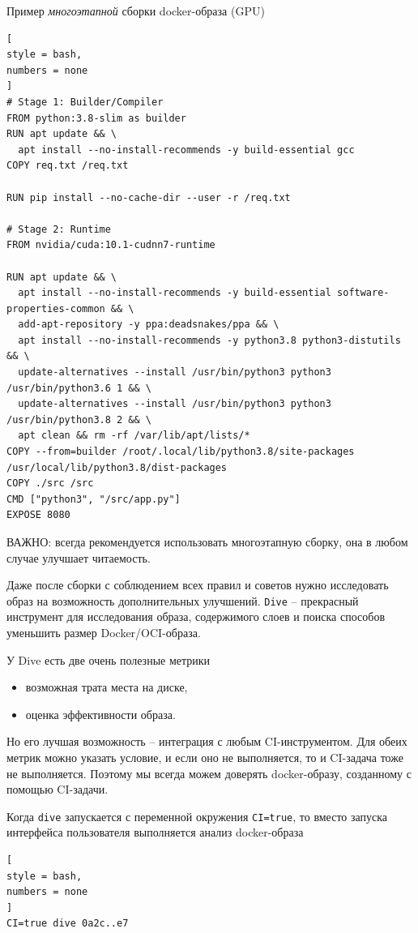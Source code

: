 \documentclass[%
	11pt,
	a4paper,
	utf8,
		]{article}
\begin{document}
Пример \emph{многоэтапной} сборки docker-образа (GPU)
\begin{lstlisting}[
style = bash,
numbers = none	
]
# Stage 1: Builder/Compiler
FROM python:3.8-slim as builder
RUN apt update && \
  apt install --no-install-recommends -y build-essential gcc
COPY req.txt /req.txt

RUN pip install --no-cache-dir --user -r /req.txt

# Stage 2: Runtime
FROM nvidia/cuda:10.1-cudnn7-runtime

RUN apt update && \
  apt install --no-install-recommends -y build-essential software-properties-common && \
  add-apt-repository -y ppa:deadsnakes/ppa && \
  apt install --no-install-recommends -y python3.8 python3-distutils && \
  update-alternatives --install /usr/bin/python3 python3 /usr/bin/python3.6 1 && \
  update-alternatives --install /usr/bin/python3 python3 /usr/bin/python3.8 2 && \
  apt clean && rm -rf /var/lib/apt/lists/*
COPY --from=builder /root/.local/lib/python3.8/site-packages /usr/local/lib/python3.8/dist-packages
COPY ./src /src
CMD ["python3", "/src/app.py"]
EXPOSE 8080
\end{lstlisting}

ВАЖНО: всегда рекомендуется использовать многоэтапную сборку, она в любом случае улучшает читаемость.

Даже после сборки с соблюдением всех правил и советов нужно исследовать образ на возможность дополнительных улучшений. \texttt{Dive} \url{} -- прекрасный инструмент для исследования образа, содержимого слоев и поиска способов уменьшить размер Docker/OCI-образа.

У Dive есть две очень полезные метрики
\begin{itemize}
	\item возможная трата места на диске,
	
	\item оценка эффективности образа.
\end{itemize}

Но его лучшая возможность -- интеграция с любым CI-инструментом. Для обеих метрик можно указать условие, и если оно не выполняется, то и CI-задача тоже не выполняется. Поэтому мы всегда можем доверять docker-образу, созданному с помощью CI-задачи.

Когда \texttt{dive} запускается с переменной окружения \texttt{CI=true}, то вместо запуска интерфейса пользователя выполняется анализ docker-образа

\begin{lstlisting}[
style = bash,
numbers = none	
]
CI=true dive 0a2c..e7
\end{lstlisting}
\end{document}
